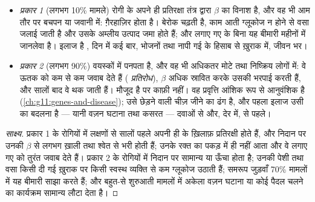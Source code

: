 \begin{proposition}[प्रकार 1 और प्रकार 2]\label{prop:g12:glucose-and-diabetes:types}
\begin{itemize}
  \item \emph{प्रकार 1 } (लगभग 10\% मामले) रोगी के अपने ही
        प्रतिरक्षा तंत्र द्वारा $\beta$  का विनाश है, और वह भी आम
        तौर पर बचपन या जवानी में:  ग़ैरहाज़िर होता है।
         बेरोक चढ़ती है, काम आती ग्लूकोज न होने से वसा जलाई
        जाती है और उसके अम्लीय उत्पाद जमा होते हैं; और लगाए गए  के
        बिना यह बीमारी महीनों में जानलेवा है। इलाज है , दिन में कई
        बार, भोजनों तथा नापी गई  के हिसाब से ख़ुराक में, जीवन
        भर।
  \item \emph{प्रकार 2 } (लगभग 90\%) वयस्कों में पनपता है, और वह भी
        अधिकतर मोटे तथा निष्क्रिय लोगों में: वे ऊतक  को कम से कम
        जवाब देते हैं (\emph{ प्रतिरोध}), $\beta$  अधिक
        स्रावित करके उसकी भरपाई करती हैं, और सालों बाद वे थक जाती हैं।
         मौजूद है पर काफ़ी नहीं। वह प्रवृत्ति आंशिक रूप से आनुवंशिक
        है (\cref{ch:g11:genes-and-disease}); उसे छेड़ने वाली चीज़ जीने का
        ढंग है, और पहला इलाज उसी का बदलना है --- यानी वज़न घटाना तथा
        कसरत --- दवाओं से और, देर में,  से पहले।
\end{itemize}
\end{proposition}
\begin{proof}[साक्ष्य]
प्रकार 1 के रोगियों में लक्षणों से सालों पहले अपनी ही   के
ख़िलाफ़ प्रतिरक्षी होते हैं, और निदान पर उनकी  $\beta$
 से लगभग ख़ाली तथा श्वेत  से भरी होती हैं; उनके रक्त का
 पकड़ में ही नहीं आता और वे लगाए गए  को तुरंत जवाब देते हैं।
प्रकार 2 के रोगियों में निदान पर  सामान्य या ऊँचा होता है; उनकी पेशी
तथा वसा  किसी दी गई  ख़ुराक पर किसी स्वस्थ व्यक्ति से कम
ग्लूकोज उठाती हैं; समरूप जुड़वाँ 70\% मामलों में यह बीमारी साझा करते हैं;
और बहुत-से शुरुआती मामलों में अकेला वज़न घटाना या कोई पैदल चलने का कार्यक्रम
सामान्य  लौटा देता है।
\end{proof}

